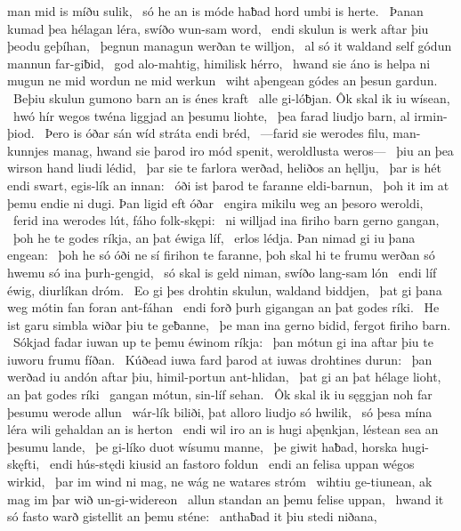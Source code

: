 man mid is míðu sulik, \hld\ só he an is móde haƀad
hord umbi is herte. \hld\ Þanan kumad þea hélagan léra,
swíðo wun-sam word, \hld\ endi skulun is werk aftar þiu
þeodu geþíhan, \hld\ þegnun managun
werðan te willjon, \hld\ al só it waldand self
gódun mannun far-giƀid, \hld\ god alo-mahtig,
himilisk hérro, \hld\ hwand sie áno is helpa ni mugun
ne mid wordun ne mid werkun \hld\ wiht aþengean
gódes an þesun gardun. \hld\ Beþiu skulun gumono barn
an is énes kraft \hld\ alle gi-lóƀjan.
Ôk skal ik iu wísean, \hld\ hwó hír wegos twéna
liggjad an þesumu liohte, \hld\ þea farad liudjo barn,
al irmin-þiod. \hld\ Þero is óðar sán
wíd stráta endi bréd, \hld\ —farid sie werodes filu,
man-kunnjes manag, hwand sie þarod iro mód spenit,
weroldlusta weros— \hld\ þiu an þea wirson hand
liudi lédid, \hld\ þar sie te farlora werðad,
heliðos an hęllju, \hld\ þar is hét endi swart,
egis-lík an innan: \hld\ óði ist þarod te faranne
eldi-barnun, \hld\ þoh it im at þemu endie ni dugi.
Þan ligid eft óðar \hld\ engira mikilu
weg an þesoro weroldi, \hld\ ferid ina werodes lút,
fáho folk-skępi: \hld\ ni willjad ina firiho barn
gerno gangan, \hld\ þoh he te godes ríkja,
an þat éwiga líf, \hld\ erlos lédja.
Þan nimad gi iu þana engean: \hld\ þoh he só óði ne sí
firihon te faranne, þoh skal hi te frumu werðan
só hwemu só ina þurh-gengid, \hld\ só skal is geld niman,
swíðo lang-sam lón \hld\ endi líf éwig,
diurlíkan dróm. \hld\ Eo gi þes drohtin skulun,
waldand biddjen, \hld\ þat gi þana weg mótin
fan foran ant-fáhan \hld\ endi forð þurh gigangan
an þat godes ríki. \hld\ He ist garu simbla
wiðar þiu te geƀanne, \hld\ þe man ina gerno bidid,
fergot firiho barn. \hld\ Sókjad fadar iuwan
up te þemu éwinom ríkja: \hld\ þan mótun gi ina aftar þiu
te iuworu frumu fíðan. \hld\ Kúðead iuwa fard þarod
at iuwas drohtines durun: \hld\ þan werðad iu andón aftar þiu,
himil-portun ant-hlidan, \hld\ þat gi an þat hélage lioht,
an þat godes ríki \hld\ gangan mótun,
sin-líf sehan. \hld\ Ôk skal ik iu sęggjan noh
far þesumu werode allun \hld\ wár-lík biliði,
þat alloro liudjo só hwilik, \hld\ só þesa mína léra wili
gehaldan an is herton \hld\ endi wil iro an is hugi aþęnkjan,
léstean sea an þesumu lande, \hld\ þe gi-líko duot
wísumu manne, \hld\ þe giwit haƀad,
horska hugi-skęfti, \hld\ endi hús-stędi kiusid
an fastoro foldun \hld\ endi an felisa uppan
wégos wirkid, \hld\ þar im wind ni mag,
ne wág ne watares stróm \hld\ wihtiu ge-tiunean,
ak mag im þar wið un-gi-widereon \hld\ allun standan
an þemu felise uppan, \hld\ hwand it só fasto warð
gistellit an þemu sténe: \hld\ anthaƀad it þiu stedi niðana,
